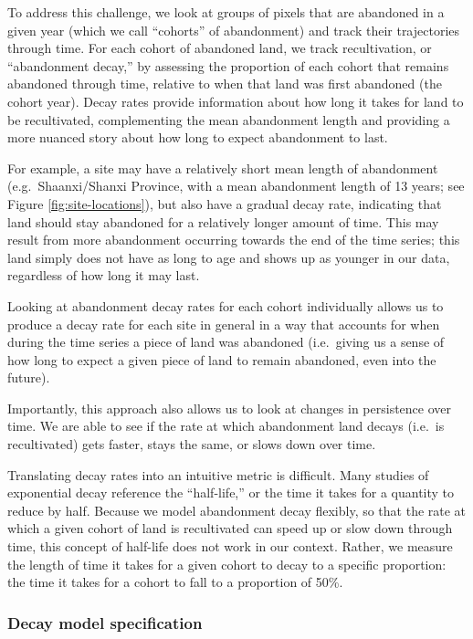 \documentclass[
]{article}
\begin{document}
To address this challenge, we look at groups of pixels that are abandoned in a given year (which we call ``cohorts'' of abandonment) and track their trajectories through time.
For each cohort of abandoned land, we track recultivation, or ``abandonment decay,'' by assessing the proportion of each cohort that remains abandoned through time, relative to when that land was first abandoned (the cohort year).
Decay rates provide information about how long it takes for land to be recultivated, complementing the mean abandonment length and providing a more nuanced story about how long to expect abandonment to last.

For example, a site may have a relatively short mean length of abandonment (e.g.~Shaanxi/Shanxi Province, with a mean abandonment length of 13 years; see Figure \ref{fig:site-locations}), but also have a gradual decay rate, indicating that land should stay abandoned for a relatively longer amount of time.
This may result from more abandonment occurring towards the end of the time series; this land simply does not have as long to age and shows up as younger in our data, regardless of how long it may last.

Looking at abandonment decay rates for each cohort individually allows us to produce a decay rate for each site in general in a way that accounts for when during the time series a piece of land was abandoned (i.e.~giving us a sense of how long to expect a given piece of land to remain abandoned, even into the future).

Importantly, this approach also allows us to look at changes in persistence over time.
We are able to see if the rate at which abandonment land decays (i.e.~is recultivated) gets faster, stays the same, or slows down over time.

Translating decay rates into an intuitive metric is difficult. Many studies of exponential decay reference the ``half-life,'' or the time it takes for a quantity to reduce by half. Because we model abandonment decay flexibly, so that the rate at which a given cohort of land is recultivated can speed up or slow down through time, this concept of half-life does not work in our context. Rather, we measure the length of time it takes for a given cohort to decay to a specific proportion: the time it takes for a cohort to fall to a proportion of 50\%.

\hypertarget{decay-model-specification}{%
\subsubsection{Decay model specification}\label{decay-model-specification}}
\end{document}
